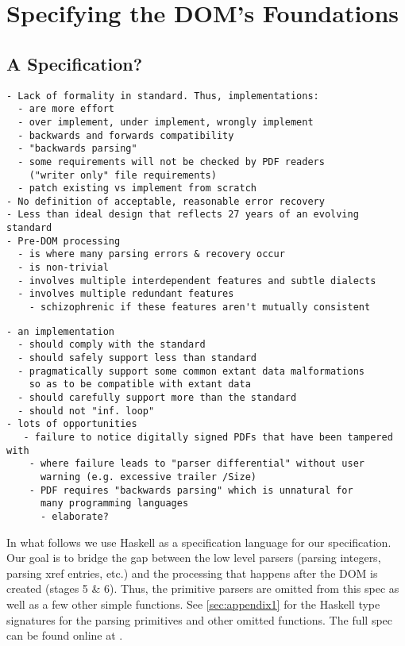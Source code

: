
\section{Specifying the DOM's Foundations }
\label{sec:specifying}

\subsection{A Specification?}

\begin{lstlisting}[style=meta]
- Lack of formality in standard. Thus, implementations:
  - are more effort
  - over implement, under implement, wrongly implement
  - backwards and forwards compatibility
  - "backwards parsing"
  - some requirements will not be checked by PDF readers
    ("writer only" file requirements) 
  - patch existing vs implement from scratch
- No definition of acceptable, reasonable error recovery
- Less than ideal design that reflects 27 years of an evolving standard
- Pre-DOM processing
  - is where many parsing errors & recovery occur
  - is non-trivial
  - involves multiple interdependent features and subtle dialects
  - involves multiple redundant features
    - schizophrenic if these features aren't mutually consistent
\end{lstlisting}

\begin{lstlisting}[style=meta]
- an implementation
  - should comply with the standard
  - should safely support less than standard
  - pragmatically support some common extant data malformations
    so as to be compatible with extant data
  - should carefully support more than the standard
  - should not "inf. loop"
- lots of opportunities
   - failure to notice digitally signed PDFs that have been tampered with
    - where failure leads to "parser differential" without user
      warning (e.g. excessive trailer /Size)
    - PDF requires "backwards parsing" which is unnatural for
      many programming languages
      - elaborate?
\end{lstlisting}

In what follows we use Haskell \cite{Haskell} as a specification language for
our specification.
%
Our goal is to bridge the gap between the low level parsers
(parsing integers, parsing xref entries, etc.) and the processing
that happens after the DOM is created (stages 5 \& 6).
%
Thus, the primitive parsers are omitted from this spec as well as a few other
simple functions.  See \cref{sec:appendix1} for the Haskell type signatures for
the parsing primitives and other omitted functions.  The full spec can be found
online at .

